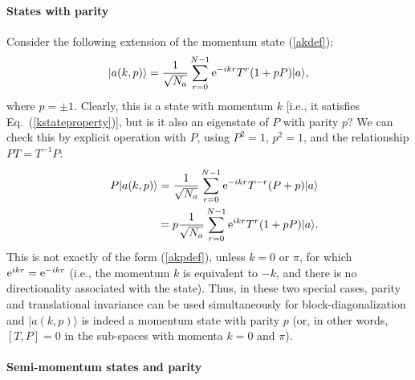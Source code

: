 \documentclass[draft,numberedheadings]{aipproc}
\begin{document}
\paragraph{States with parity}

Consider the following extension of the momentum state (\ref{akdef});
\begin{equation}
|a(k,p)\rangle = \frac{1}{\sqrt{N_a}} \sum_{r=0}^{N-1} {\rm e}^{-ikr} T^r(1 + pP)|a\rangle,
\label{akpdef}
\end{equation}
where $p=\pm 1$. Clearly, this is a state with momentum $k$ [i.e., it satisfies Eq.~(\ref{kstateproperty})], but is it also an eigenstate of $P$ with 
parity $p$? We can check this by explicit operation with $P$, using $P^2=1$, $p^2=1$, and the relationship $PT=T^{-1}P$:
\begin{eqnarray}
&&P|a(k,p)\rangle = \frac{1}{\sqrt{N_a}} \sum_{r=0}^{N-1} {\rm e}^{-ikr} T^{-r}(P+p)|a\rangle \nonumber \\
      &&\hskip16mm = p\frac{1}{\sqrt{N_a}} \sum_{r=0}^{N-1} {\rm e}^{ikr} T^{r}(1 + pP)|a\rangle.
\end{eqnarray}
This is not exactly of the form (\ref{akpdef}), unless $k=0$ or $\pi$, for which ${\rm e}^{ikr}={\rm e}^{-ikr}$ (i.e., the momentum $k$ is equivalent to $-k$, and 
there is no directionality associated with the state). Thus, in these two special cases, parity and translational invariance can be used simultaneously for
block-diagonalization and $|a(k,p)\rangle$ is indeed a momentum state with parity $p$ (or, in other words, $[T,P]=0$ in the sub-spaces with momenta $k=0$ 
and $\pi$). 

\paragraph{Semi-momentum states and parity}
\end{document}
